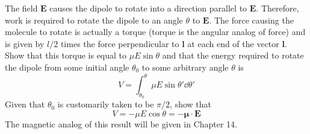 \documentclass[../notes.tex]{subfiles}
\begin{document}
\begin{enumerate}[label={\textbf{13-\arabic*.}},ref={13-\arabic*}]
\begin{center}
    \end{center}
    The field $\bm{E}$ causes the dipole to rotate into a direction parallel to $\bm{E}$. Therefore, work is required to rotate the dipole to an angle $\theta$ to $\bm{E}$. The force causing the molecule to rotate is actually a torque (torque is the angular analog of force) and is given by $l/2$ times the force perpendicular to $\mathbf{l}$ at each end of the vector $\mathbf{l}$. Show that this torque is equal to $\mu E\sin\theta$ and that the energy required to rotate the dipole from some initial angle $\theta_0$ to some arbitrary angle $\theta$ is
    \begin{equation*}
        V = \int_{\theta_0}^\theta\mu E\sin\theta'\dd{\theta'}
    \end{equation*}
    Given that $\theta_0$ is customarily taken to be $\pi/2$, show that
    \begin{equation*}
        V = -\mu E\cos\theta = -\bm{\mu}\cdot\bm{E}
    \end{equation*}
    The magnetic analog of this result will be given in Chapter 14.
\end{enumerate}
\end{document}
